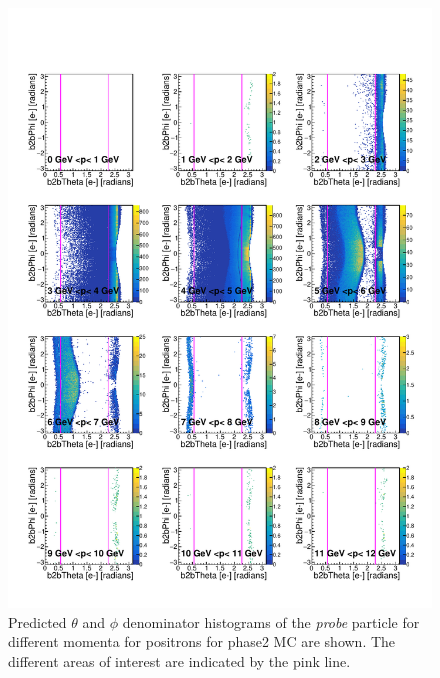 \documentclass[a4paper,11pt,twosided,final,german,openbib,pdftex,listof=totoc,bibliography=totoc]{scrbook}
\begin{document}
\begin{appendix}
\begin{figure}[h!]
	\includegraphics[width=\textwidth]{Plots/RTPMepD_MC.pdf}
	\caption[Denominator $\theta$-$\phi$ Positron Momentum Phase2 MC]{Predicted $\theta$ and $\phi$ denominator histograms of the \textit{probe} particle for different momenta for positrons for phase2 MC are shown. The different areas of interest are indicated by the pink line.}
	\label{plt:RTPMepD_MC}
\end{figure}




\end{appendix}
\end{document}
